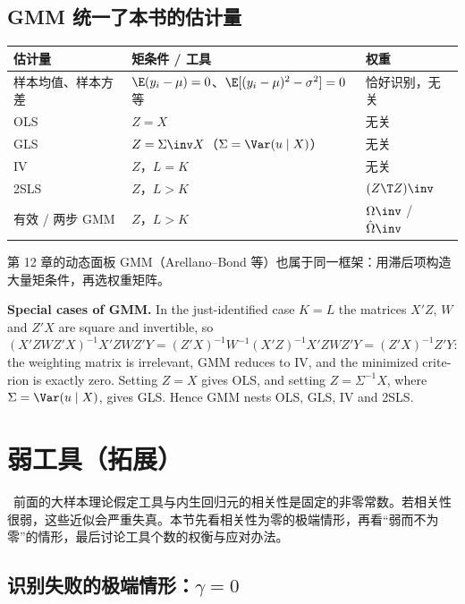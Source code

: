 \subsection{GMM 统一了本书的估计量}\label{sec:U08b-unify}

\begin{center}
\small
\begin{tabularx}{\linewidth}{>{\raggedright\arraybackslash}p{2.6cm}L>{\raggedright\arraybackslash}p{3.2cm}}
\toprule
估计量 & 矩条件 / 工具 & 权重\\
\midrule
样本均值、样本方差 & $\E(y_i-\mu)=0$、$\E[(y_i-\mu)^2-\sigma^2]=0$ 等 & 恰好识别，无关\\
OLS & $Z=X$ & 无关\\
GLS & $Z=\Sigma\inv X$（$\Sigma=\Var(u\mid X)$） & 无关\\
IV & $Z$，$L=K$ & 无关\\
2SLS & $Z$，$L>K$ & $(Z\T Z)\inv$\\
有效 / 两步 GMM & $Z$，$L>K$ & $\Omega\inv$ / $\hat\Omega\inv$\\
\bottomrule
\end{tabularx}
\end{center}
第 12 章的动态面板 GMM（Arellano--Bond 等）也属于同一框架：用滞后项构造大量矩条件，再选权重矩阵。

\begin{english}
\textbf{Special cases of GMM.} In the just-identified case $K=L$ the matrices $X'Z$, $W$ and $Z'X$ are square and invertible, so $(X'ZWZ'X)^{-1}X'ZWZ'Y=(Z'X)^{-1}W^{-1}(X'Z)^{-1}X'ZWZ'Y=(Z'X)^{-1}Z'Y$: the weighting matrix is irrelevant, GMM reduces to IV, and the minimized criterion is exactly zero. Setting $Z=X$ gives OLS, and setting $Z=\Sigma^{-1}X$, where $\Sigma=\Var(u\mid X)$, gives GLS. Hence GMM nests OLS, GLS, IV and 2SLS.
\end{english}

\section{弱工具（拓展）}\label{sec:U08b-weak}

\tagext\ 前面的大样本理论假定工具与内生回归元的相关性是固定的非零常数。若相关性很弱，这些近似会严重失真。本节先看相关性为零的极端情形，再看“弱而不为零”的情形，最后讨论工具个数的权衡与应对办法。

\subsection{识别失败的极端情形：\texorpdfstring{$\gamma=0$}{gamma = 0}}\label{sec:U08b-idfail}

